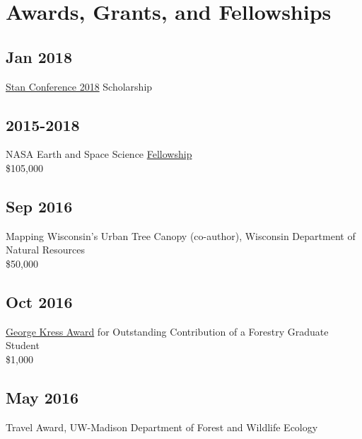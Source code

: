 \documentclass[11pt, sans]{moderncv}
\begin{document}
\section*{Awards, Grants, and Fellowships}
\label{sec:org9b56e2d}


\cvitemwithcomment{}{}{}
\cvitemwithcomment{}{}{}
\cvitemwithcomment{}{}{}
\cvitemwithcomment{}{}{}
\cvitemwithcomment{}{}{}
\cvitemwithcomment{}{}{}



\subsection*{Jan 2018}
\label{sec:org380a908}
\href{http://mc-stan.org/events/}{Stan Conference 2018} Scholarship

\subsection*{2015-2018}
\label{sec:orgca13e95}
NASA Earth and Space Science \href{https://nspires.nasaprs.com/external/viewrepositorydocument/cmdocumentid=459947/solicitationId=\%7BB6CDCEA6-8EDD-A48A-FAF8-E588F66661C3\%7D/viewSolicitationDocument=1/NESSF15\%20selections.pdf}{Fellowship}\\
\$105,000

\subsection*{Sep 2016}
\label{sec:org4a47595}
Mapping Wisconsin's Urban Tree Canopy (co-author), Wisconsin
Department of Natural Resources\\
\$50,000

\subsection*{Oct 2016}
\label{sec:org7eefa44}
\href{https://kb.wisc.edu/russell/page.php?id=65402}{George Kress Award} for Outstanding Contribution of a Forestry Graduate
Student \\
\$1,000

\subsection*{May 2016}
\label{sec:org6c84b79}
Travel Award, UW-Madison Department of Forest and Wildlife Ecology\\
\end{document}
